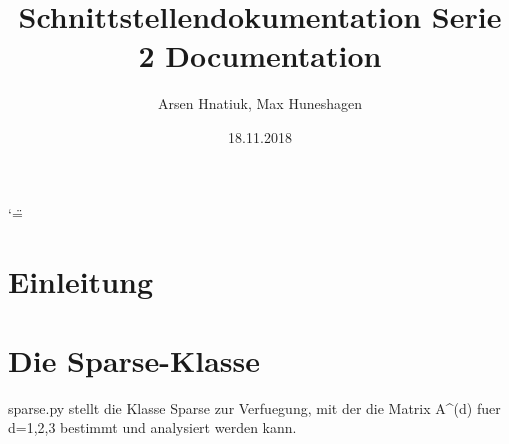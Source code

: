 \documentclass[a4paper,10pt,ngerman, openright]{sphinxmanual}
\title{Schnittstellendokumentation Serie 2 Documentation}
\date{18.11.2018}
\author{Arsen Hnatiuk, Max Huneshagen}
\begin{document}
\let\cleardoublepage\clearpage
\ifnum\catcode`\"=\active{}\fi
\maketitle
\sphinxtableofcontents
{}\label{\detokenize{index::doc}}


\chapter{Einleitung}
\let\cleardoublepage\clearpage
\chapter{Die Sparse-Klasse}
\label{\detokenize{index:welcome-to-schnittstellendokumentation-serie-2-s-documentation}}\label{\detokenize{index:module-sparse}}\label{\detokenize{index:die-sparse-klasse}}
sparse.py stellt die Klasse Sparse zur Verfuegung, mit der die Matrix A\textasciicircum{}(d) fuer d=1,2,3
bestimmt und analysiert werden kann.
\end{document}
